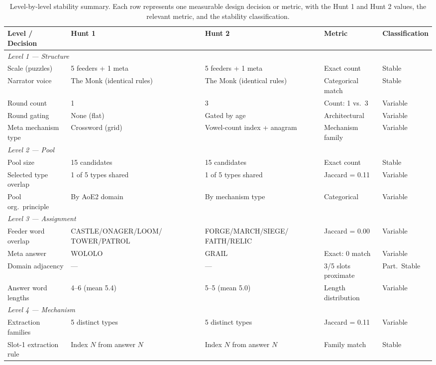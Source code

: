 \begin{table}[h]
\centering
\caption{Level-by-level stability summary. Each row represents one measurable design decision or metric, with the Hunt 1 and Hunt 2 values, the relevant metric, and the stability classification.}
\label{tab:stability-summary}
\small
\begin{tabular}{p{2.4cm}p{2.8cm}p{2.8cm}p{2.2cm}l}
\toprule
\textbf{Level / Decision} & \textbf{Hunt 1} & \textbf{Hunt 2} & \textbf{Metric} & \textbf{Classification} \\
\midrule
\multicolumn{5}{l}{\textit{Level 1 --- Structure}} \\
Scale (puzzles) & 5 feeders + 1 meta & 5 feeders + 1 meta & Exact count & Stable \\
Narrator voice & The Monk (identical rules) & The Monk (identical rules) & Categorical match & Stable \\
Round count & 1 & 3 & Count: 1 vs.\ 3 & Variable \\
Round gating & None (flat) & Gated by age & Architectural & Variable \\
Meta mechanism type & Crossword (grid) & Vowel-count index + anagram & Mechanism family & Variable \\
\midrule
\multicolumn{5}{l}{\textit{Level 2 --- Pool}} \\
Pool size & 15 candidates & 15 candidates & Exact count & Stable \\
Selected type overlap & 1 of 5 types shared & 1 of 5 types shared & Jaccard = 0.11 & Variable \\
Pool org.\ principle & By AoE2 domain & By mechanism type & Categorical & Variable \\
\midrule
\multicolumn{5}{l}{\textit{Level 3 --- Assignment}} \\
Feeder word overlap & CASTLE/ONAGER/LOOM/ TOWER/PATROL & FORGE/MARCH/SIEGE/ FAITH/RELIC & Jaccard = 0.00 & Variable \\
Meta answer & WOLOLO & GRAIL & Exact: 0 match & Variable \\
Domain adjacency & --- & --- & 3/5 slots proximate & Part.\ Stable \\
Answer word lengths & 4--6 (mean 5.4) & 5--5 (mean 5.0) & Length distribution & Variable \\
\midrule
\multicolumn{5}{l}{\textit{Level 4 --- Mechanism}} \\
Extraction families & 5 distinct types & 5 distinct types & Jaccard = 0.11 & Variable \\
Slot-1 extraction rule & Index $N$ from answer $N$ & Index $N$ from answer $N$ & Family match & Stable \\

\end{tabular}
\end{table}

